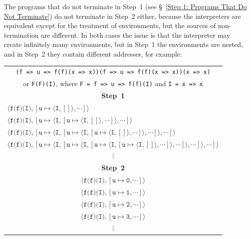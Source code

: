 \documentclass[12pt, oneside]{book}
\begin{document}
The programs that do not terminate in Step~1 (see §~\ref{Step 1: Programs That Do Not Terminate}) do not terminate in Step~2 either, because the interpreters are equivalent except for the treatment of environments, but the sources of non-termination are different. In both cases the issue is that the interpreter may create infinitely many environments, but in Step~1 the environments are nested, and in Step~2 they contain different addresses, for example:

\begin{center}
\begin{tabular}{l}
\multicolumn{1}{c}{\texttt{(f => u => f(f)(x => x))(f => u => f(f)(x => x))(x => x)}} \\
\multicolumn{1}{c}{or \texttt{F(F)(I)}, where \texttt{F = f => u => f(f)(I)} and \texttt{I = x => x}} \\
\multicolumn{1}{c}{\textbf{Step~1}} \\
$\langle \texttt{f(f)(I)}, [\texttt{u} \mapsto \langle \texttt{I}, [] \rangle, \cdots] \rangle$ \\
$\langle \texttt{f(f)(I)}, [\texttt{u} \mapsto \langle \texttt{I}, [\texttt{u} \mapsto \langle \texttt{I}, [] \rangle, \cdots] \rangle, \cdots] \rangle$ \\
$\langle \texttt{f(f)(I)}, [\texttt{u} \mapsto \langle \texttt{I}, [\texttt{u} \mapsto \langle \texttt{I}, [\texttt{u} \mapsto \langle \texttt{I}, [] \rangle, \cdots] \rangle, \cdots] \rangle, \cdots] \rangle$ \\
$\langle \texttt{f(f)(I)}, [\texttt{u} \mapsto \langle \texttt{I}, [\texttt{u} \mapsto \langle \texttt{I}, [\texttt{u} \mapsto \langle \texttt{I}, [\texttt{u} \mapsto \langle \texttt{I}, [] \rangle, \cdots] \rangle, \cdots] \rangle, \cdots] \rangle, \cdots] \rangle$ \\
\multicolumn{1}{c}{$\vdots$} \\
\multicolumn{1}{c}{\textbf{Step~2}} \\
\multicolumn{1}{c}{$\langle \texttt{f(f)(I)}, [\texttt{u} \mapsto \texttt{0}, \cdots] \rangle$} \\
\multicolumn{1}{c}{$\langle \texttt{f(f)(I)}, [\texttt{u} \mapsto \texttt{1}, \cdots] \rangle$} \\
\multicolumn{1}{c}{$\langle \texttt{f(f)(I)}, [\texttt{u} \mapsto \texttt{2}, \cdots] \rangle$} \\
\multicolumn{1}{c}{$\langle \texttt{f(f)(I)}, [\texttt{u} \mapsto \texttt{3}, \cdots] \rangle$} \\
\multicolumn{1}{c}{$\vdots$} \\
\end{tabular}
\end{center}
\end{document}
